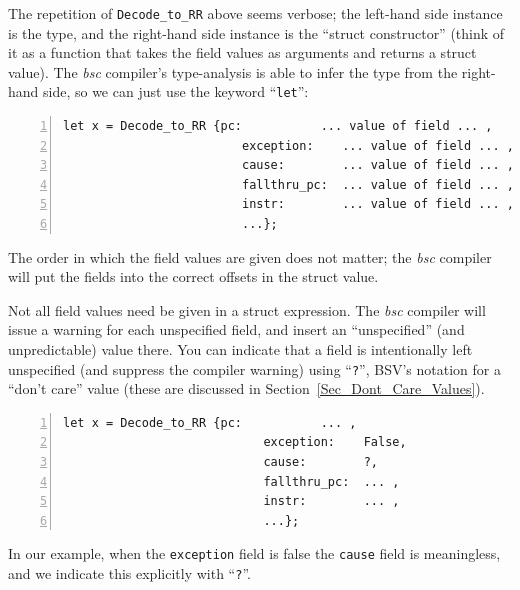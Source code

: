 \vspace{2ex}

The repetition of \verb|Decode_to_RR| above seems verbose; the
left-hand side instance is the type, and the right-hand side instance
is the ``struct constructor'' (think of it as a function that takes
the field values as arguments and returns a struct value). The
\emph{bsc} compiler's type-analysis is able to infer the type from the
right-hand side, so we can just use the keyword ``\verb|let|'':


{\small
\begin{Verbatim}[frame=single, numbers=left]
   let x = Decode_to_RR {pc:           ... value of field ... ,
                         exception:    ... value of field ... ,
                         cause:        ... value of field ... ,
                         fallthru_pc:  ... value of field ... ,
                         instr:        ... value of field ... ,
                         ...};
\end{Verbatim}
}

The order in which the field values are given does not matter; the
\emph{bsc} compiler will put the fields into the correct offsets in
the struct value.

Not all field values need be given in a struct expression.  The
\emph{bsc} compiler will issue a warning for each unspecified field,
and insert an ``unspecified'' (and unpredictable) value there.  You
can indicate that a field is intentionally left unspecified (and
suppress the compiler warning) using ``\verb|?|'', BSV's notation for
a ``don't care'' value (these are discussed in
Section~\ref{Sec_Dont_Care_Values}).

{\small
\begin{Verbatim}[frame=single, numbers=left]
      let x = Decode_to_RR {pc:           ... ,
                            exception:    False,
                            cause:        ?,
                            fallthru_pc:  ... ,
                            instr:        ... ,
                            ...};
\end{Verbatim}
}

In our example, when the \verb|exception| field is false the
\verb|cause| field is meaningless, and we indicate this explicitly
with ``\verb|?|''.


